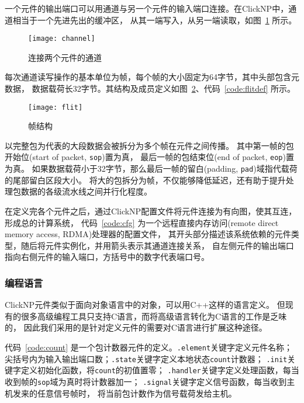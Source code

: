 一个元件的输出端口可以用通道与另一个元件的输入端口连接。在ClickNP中，通道相当于一个先进先出的缓冲区，
从其一端写入，从另一端读取，如图~\ref{fig:channel} 所示。
\begin{figure}[htbp]
\centering
\texttt{[image: channel]}
\caption{连接两个元件的通道} \label{fig:channel}
\end{figure}

每次通道读写操作的基本单位为帧，每个帧的大小固定为64字节，其中头部包含元数据，
数据载荷长32字节。其结构及成员定义如图~\ref{fig:flit}、代码~\ref{code:flitdef} 所示。
\begin{figure}[htbp]
\centering
\texttt{[image: flit]}
\caption{帧结构} \label{fig:flit}
\end{figure}



以完整包为代表的大段数据会被拆分为多个帧在元件之间传播。
其中第一帧的包开始位(start of packet, \lstinline$sop$)置为真，
最后一帧的包结束位(end of packet, \lstinline$eop$)置为真。
如果数据载荷小于32字节，那么最后一帧的留白(padding, \lstinline$pad$)域指代载荷的尾部留白区段大小。
将大的包拆分为帧，不仅能够降低延迟，还有助于提升处理包数据的各级流水线之间并行化程度。

在定义完各个元件之后，通过ClickNP配置文件将元件连接为有向图，使其互连，形成总的计算系统，
代码~\ref{code:cfg} 为一个远程直接内存访问(remote direct memory access, RDMA)处理器的配置文件，
其开头部分描述该系统依赖的元件类型，随后将元件实例化，并用箭头表示其通道连接关系，
自左侧元件的输出端口指向右侧元件的输入端口，方括号中的数字代表端口号。
\begin{figure}[htbp]
\centering

\end{figure}

\subsubsection{编程语言}
ClickNP元件类似于面向对象语言中的对象，可以用C++这样的语言定义。
但现有的很多高级编程工具只支持C语言，而将高级语言转化为C语言的工作是乏味的，
因此我们采用的是针对定义元件的需要对C语言进行扩展这种途径。

\begin{figure}[htbp]
\centering

\end{figure}
代码~\ref{code:count} 是一个包计数器元件的定义。\lstinline$.element$关键字定义元件名称；
尖括号内为输入输出端口数；\lstinline$.state$关键字定义本地状态\lstinline$count$计数器；
\lstinline$.init$关键字定义初始化函数，将\lstinline$count$的初值置零；
\lstinline$.handler$关键字定义处理函数，每当收到帧的\lstinline$sop$域为真时将计数器加一；
\lstinline$.signal$关键字定义信号函数，每当收到主机发来的任意信号帧时，
将当前包计数作为信号载荷发给主机。


